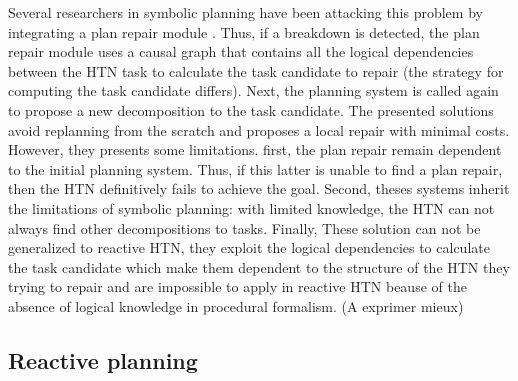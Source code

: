 \documentclass[conference]{IEEEtran}
\begin{document}
		Several researchers in symbolic planning have been attacking this problem by integrating a plan repair module \cite{boella2002replanning, van2005plan,hayashi2006dynagent,ayan2007hotride,warfield2007adaptation}. Thus, if a breakdown is detected, the plan repair module uses a causal graph that contains all the logical dependencies between the HTN task  to calculate the task candidate to repair (the strategy for computing the task candidate differs). Next, the planning system is called again to propose a new decomposition to the  task candidate.
		 The presented solutions avoid replanning from the scratch and proposes a local repair with minimal costs. However, they presents some limitations. first, the plan repair remain dependent to the initial planning system. Thus, if this latter is unable to find a plan repair, then the HTN definitively fails to achieve the goal. Second, theses systems inherit the limitations of symbolic planning: with limited knowledge, the HTN can not always find other decompositions to tasks. Finally,  These solution can not be generalized to reactive HTN, they exploit the logical dependencies to calculate the task candidate which make them dependent to the structure of the HTN they trying to repair and are impossible to apply in reactive HTN beause of the absence of logical knowledge in procedural formalism. (A exprimer mieux)
		 
	
	\subsection{Reactive planning}
	
\end{document}
